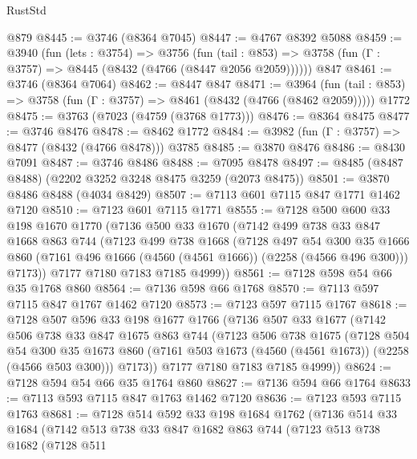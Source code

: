 \begin{lexlean}{RustStd}
\begin{coremodule}
    @879
@8445 := @3746 (@8364 @7045)
@8447 := @4767 @8392 @5088
@8459 := @3940
    (fun (lets : @3754) =>
    @3756
      (fun (tail : @853) => @3758 (fun (Γ : @3757) => @8445 (@8432 (@4766 (@8447 @2056 @2059))))))
    @847
@8461 := @3746 (@8364 @7064)
@8462 := @8447 @847
@8471 := @3964
    (fun (tail : @853) => @3758 (fun (Γ : @3757) => @8461 (@8432 (@4766 (@8462 @2059)))))
    @1772
@8475 := @3763 (@7023 (@4759 (@3768 @1773)))
@8476 := @8364 @8475
@8477 := @3746 @8476
@8478 := @8462 @1772
@8484 := @3982 (fun (Γ : @3757) => @8477 (@8432 (@4766 @8478))) @3785
@8485 := @3870 @8476
@8486 := @8430 @7091
@8487 := @3746 @8486
@8488 := @7095 @8478
@8497 := @8485 (@8487 @8488) (@2202 @3252 @3248 @8475 @3259 (@2073 @8475))
@8501 := @3870 @8486 @8488 (@4034 @8429)
@8507 := @7113 @601 @7115 @847 @1771 @1462 @7120
@8510 := @7123 @601 @7115 @1771
@8555 := @7128
    @500
    @600
    @33
    @198
    @1670
    @1770
    (@7136
      @500
      @33
      @1670
      (@7142
        @499
        @738
        @33
        @847
        @1668
        @863
        @744
        (@7123
          @499
          @738
          @1668
          (@7128
            @497
            @54
            @300
            @35
            @1666
            @860
            (@7161 @496 @1666 (@4560 (@4561 @1666)) (@2258 (@4566 @496 @300)))
            @7173))
        @7177
        @7180
        @7183
        @7185
        @4999))
@8561 := @7128 @598 @54 @66 @35 @1768 @860
@8564 := @7136 @598 @66 @1768
@8570 := @7113 @597 @7115 @847 @1767 @1462 @7120
@8573 := @7123 @597 @7115 @1767
@8618 := @7128
    @507
    @596
    @33
    @198
    @1677
    @1766
    (@7136
      @507
      @33
      @1677
      (@7142
        @506
        @738
        @33
        @847
        @1675
        @863
        @744
        (@7123
          @506
          @738
          @1675
          (@7128
            @504
            @54
            @300
            @35
            @1673
            @860
            (@7161 @503 @1673 (@4560 (@4561 @1673)) (@2258 (@4566 @503 @300)))
            @7173))
        @7177
        @7180
        @7183
        @7185
        @4999))
@8624 := @7128 @594 @54 @66 @35 @1764 @860
@8627 := @7136 @594 @66 @1764
@8633 := @7113 @593 @7115 @847 @1763 @1462 @7120
@8636 := @7123 @593 @7115 @1763
@8681 := @7128
    @514
    @592
    @33
    @198
    @1684
    @1762
    (@7136
      @514
      @33
      @1684
      (@7142
        @513
        @738
        @33
        @847
        @1682
        @863
        @744
        (@7123
          @513
          @738
          @1682
          (@7128
            @511

\end{coremodule}
\end{lexlean}
